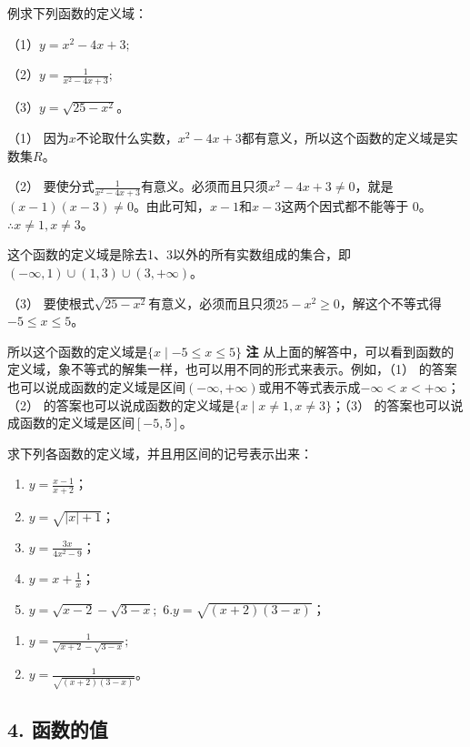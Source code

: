 例求下列函数的定义域：

（1）\(y = x^{2} - 4x + 3;\)

（2）\(y = \frac{1}{x^2 - 4x + 3};\)

（3）\(y = \sqrt{25 - x^2}\)。

 （1）
因为\(x\)不论取什么实数，\(x^2 - 4x + 3\)都有意义，所以这个函数的定义域是实数集\(R\)。

（2）
要使分式\(\frac{1}{x^2 - 4x + 3}\)有意义。必须而且只须\(x^2 - 4x + 3 \neq 0\)，就是\((x - 1)(x - 3) \neq 0\)。由此可知，\(x - 1\)和\(x - 3\)这两个因式都不能等于
0。\(\therefore x \neq 1, x \neq 3\)。

这个函数的定义域是除去1、3以外的所有实数组成的集合，即\((-∞,1)∪(1,3)∪(3,+∞)\)。

（3）
要使根式\(\sqrt{25 - x^2}\)有意义，必须而且只须\(25 - x^2 \geqslant 0\)，解这个不等式得\(-5 \leqslant x \leqslant 5\)。

所以这个函数的定义域是\(\{x\mid -5\leqslant x\leqslant 5\}\) \textbf{注}
从上面的解答中，可以看到函数的定义域，象不等式的解集一样，也可以用不同的形式来表示。例如，（1）
的答案也可以说成函数的定义域是区间\((- \infty, + \infty)\)或用不等式表示成\(- \infty < x < + \infty\)；（2）
的答案也可以说成函数的定义域是\(\{x \mid x \neq 1, x \neq 3\}\)；（3）
的答案也可以说成函数的定义域是区间\([-5, 5]\)。

求下列各函数的定义域，并且用区间的记号表示出来：

\begin{enumerate}[start=1]
\item
  \(y = \frac{x - 1}{x + 2}\)；
\item
  \(y = \sqrt{|x| + 1}\)；
\item
  \(y = \frac{3x}{4x^2 - 9}\)；
\item
  \(y = x + \frac{1}{x}\)；
\item
  \(y = \sqrt{x - 2} -\sqrt{3 - x};\) 6.\(y = \sqrt{(x + 2)(3 - x)}\)；
\end{enumerate}

\begin{enumerate}[start=7]
\item
  \(y = \frac{1}{\sqrt{x + 2} - \sqrt{3 - x}};\)
\item
  \(y = \frac{1}{\sqrt{(x + 2)(3 - x)}}\)。
\end{enumerate}

\subsection{4. 函数的值}


